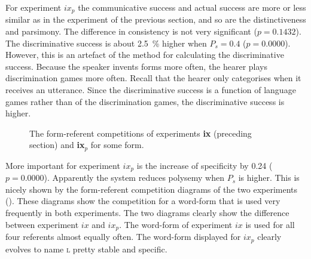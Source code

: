 For experiment {$ix_p$} the communicative success and actual success are more or less similar as in the experiment of the previous section, and so are the distinctiveness and parsimony. The difference in consistency is not very significant ($p=0.1432$). The discriminative success is about 2.5~\% higher when $P_s=0.4$ ($p=0.0000$). However, this is an artefact of the method for calculating the discriminative success. Because the speaker invents forms more often, the hearer plays discrimination games more often. Recall that the hearer only categorises when it receives an utterance. Since the discriminative success is a function of language games rather than of the discrimination games, the discriminative success is higher.

\begin{figure}[t]
\centering
{}
\caption{The form-referent competitions of experiments {\bf ix} (preceding section) and {\bf ix$_p$} for some form.}
\label{f:par:FR-comp}
\end{figure}

\enlargethispage{1\baselineskip}
More important for experiment $ix_p$ is the increase of specificity by 0.24 ($p=0.0000$). Apparently the system reduces polysemy when $P_s$ is higher. This is nicely shown by the form-referent competition diagrams of the two experiments (). These diagrams show the competition for a word-form that is used very frequently in both experiments. The two diagrams clearly show the difference between experiment $ix$ and $ix_p$. The word-form of experiment $ix$ is used for all four referents almost equally often. The word-form displayed for $ix_p$ clearly evolves to name {\scshape l} pretty stable and specific.

